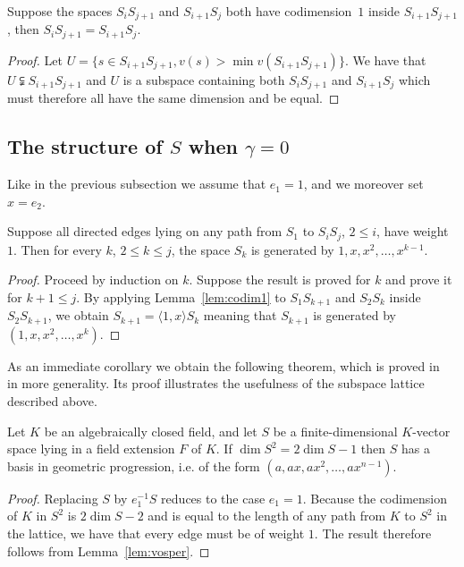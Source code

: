 \documentclass[ALCO,Unicode,ThmDefs]{cedram}
\renewcommand{\leq}{\leqslant}
\begin{document}
\begin{lemm}\label{lem:codim1}
Suppose the spaces $S_iS_{j+1}$ and $S_{i+1}S_j$ both have codimension~$1$ inside $S_{i+1}S_{j+1}$, then $S_iS_{j+1}= S_{i+1}S_j$.
\end{lemm}

\begin{proof}
Let $U=\{s\in S_{i+1}S_{j+1}, v(s)>\min v(S_{i+1}S_{j+1})\}$. We have that $U\subsetneqq S_{i+1}S_{j+1}$ and $U$ is a subspace containing both $S_iS_{j+1}$ and $S_{i+1}S_j$ which must therefore all have the same dimension and be equal.
\end{proof}

\subsection{The structure of \texorpdfstring{$S$}{S} when \texorpdfstring{$\gamma=0$}{gamma=0}}\label{sec:Vosper}

Like in the previous subsection we assume that $e_1=1$, and we moreover set $x=e_2$.

\begin{lemm}\label{lem:vosper}
Suppose all directed edges lying on any path from $S_1$ to $S_iS_j$, $2\leq i$, have weight~$1$. Then for every $k$, $2\leq k\leq j$, the space $S_k$ is generated by $1,x,x^2,\ldots,x^{k-1}$.
\end{lemm}

\begin{proof}
Proceed by induction on $k$. Suppose the result is proved for $k$ and prove it for $k+1\leq j$. By applying Lemma~\ref{lem:codim1} to $S_1S_{k+1}$ and $S_2S_k$ inside $S_2S_{k+1}$, we obtain $S_{k+1}=\langle 1,x\rangle S_k$ meaning that $S_{k+1}$ is generated by $(1,x,x^2,\ldots,x^{k})$.
\end{proof}

As an immediate corollary we obtain the following theorem, which is proved in~\cite{bszVosper} in more generality. Its proof illustrates the usefulness of the subspace lattice described above.


\begin{theo}\label{thm:genus0}
Let $K$ be an algebraically closed field, and let $S$ be a finite-dimensional $K$-vector space lying in a field extension $F$ of $K$. If $\dim S^2=2\dim S-1$ then $S$ has a basis in geometric progression, i.e. of the form $(a,ax,ax^2,\ldots,ax^{n-1})$.
\end{theo}

\begin{proof}
Replacing $S$ by $e_1^{-1}S$ reduces to the case
$e_1=1$. Because the codimension of $K$ in $S^2$ is $2\dim S-2$ and is equal to the length of any path from $K$ to $S^2$ in the lattice, we have that every edge must be of weight $1$. The result therefore follows from Lemma~\ref{lem:vosper}.
\end{proof}
\end{document}
